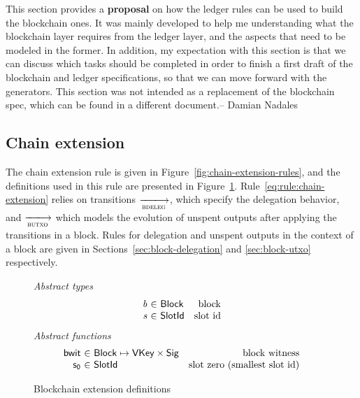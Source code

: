 \begin{note}
  This section provides a \textbf{proposal} on how the ledger rules can be used
  to build the blockchain ones. It was mainly developed to help me
  understanding what the blockchain layer requires from the ledger layer, and
  the aspects that need to be modeled in the former. In addition, my
  expectation with this section is that we can discuss which tasks should be
  completed in order to finish a first draft of the blockchain and ledger
  specifications, so that we can move forward with the generators. This section
  was not intended as a replacement of the blockchain spec, which can be found
  in a different document.-- Damian Nadales
\end{note}

\subsection{Chain extension}
\label{sec:chain-extension}

The chain extension rule is given in Figure~\ref{fig:chain-extension-rules},
and the definitions used in this rule are presented in
Figure~\ref{fig:defs:chain-extension}. Rule~\ref{eq:rule:chain-extension}
relies on transitions $\trans{bdeleg}{}$, which specify the delegation
behavior, and $\trans{butxo}{}$ which models the evolution of unspent outputs
after applying the transitions in a block. Rules for delegation and unspent
outputs in the context of a block are given in
Sections~\ref{sec:block-delegation} and \ref{sec:block-utxo} respectively.

\begin{figure}
  \emph{Abstract types}
  \begin{equation*}
    \begin{array}{r@{~\in~}lr}
      \var{b} & \Block & \text{block}\\
      \var{s} & \SlotId & \text{slot id}\\
    \end{array}
  \end{equation*}
  \emph{Abstract functions}
  \begin{equation*}
    \begin{array}{r@{~\in~}lr}
    \fun{bwit} & \Block \mapsto \VKey \times \Sig & \text{block witness}\\
    \fun{s_0} & \SlotId  & \text{slot zero (smallest slot id)}\\
    \end{array}
  \end{equation*}
  \caption{Blockchain extension definitions}
  \label{fig:defs:chain-extension}
\end{figure}

